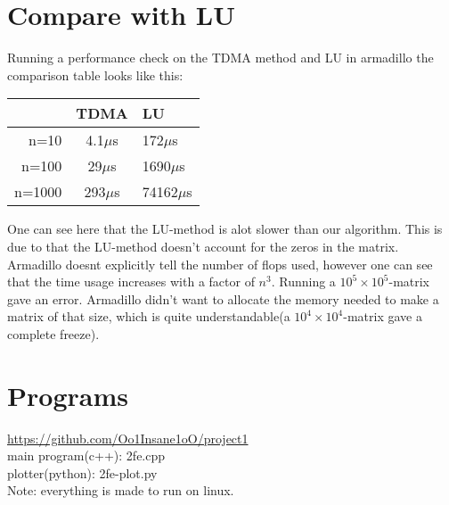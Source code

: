 \documentclass[a4 paper]{report}
\begin{document}
\section*{Compare with LU}
Running a performance check on the TDMA method and LU in armadillo the comparison table looks like this:\\
\begin{center}
  \begin{tabular}{r | c | l}
    & TDMA & LU \\ \hline
    n=10 & 4.1$\mu$s & 172$\mu$s \\ \hline
    n=100 & 29$\mu$s & 1690$\mu$s \\ \hline
    n=1000 & 293$\mu$s & 74162$\mu$s \\ 
  \end{tabular}
\end{center}
One can see here that the LU-method is alot slower than our algorithm. This is due to that the LU-method doesn't account for the zeros in the matrix. Armadillo doesnt explicitly tell the number of flops used, however one can see that the time usage increases with a factor of $n^3$. Running a $10^5\times 10^5$-matrix gave an error. Armadillo didn't want to allocate the memory needed to make a matrix of that size, which is quite understandable(a $10^4\times 10^4$-matrix gave a complete freeze).

\section*{Programs}
\url{https://github.com/Oo1Insane1oO/project1}\\
main program(c++): 2fe.cpp\\
plotter(python): 2fe-plot.py\\
Note: everything is made to run on linux.
\end{document}
